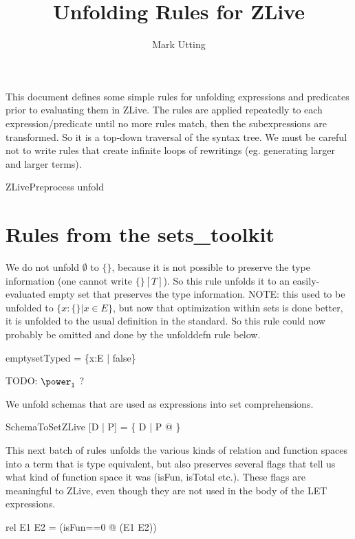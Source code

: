 \documentclass{article}
\title{Unfolding Rules for ZLive}
\author{Mark Utting}
\begin{document}
\maketitle


This document defines some simple rules for unfolding expressions 
and predicates prior to evaluating them in ZLive.  The rules are
applied repeatedly to each expression/predicate until no more rules
match, then the subexpressions are transformed.  So it is a top-down
traversal of the syntax tree.  We must be careful not to write rules
that create infinite loops of rewritings (eg. generating larger and
larger terms).

\begin{zsection}
  \SECTION ZLivePreprocess \parents unfold
\end{zsection}

\section{Rules from the sets\_toolkit}

We do not unfold $\emptyset$ to $\{\}$, because it is not possible
to preserve the type information (one cannot write $\{\}[T]$).
So this rule unfolds it to an easily-evaluated empty set that
preserves the type information.  
NOTE: this used to be unfolded to $\{x:\{\} | x \in E\}$, but
now that optimization within sets is done better, it is unfolded
to the usual definition in the standard.  So this rule could now
probably be omitted and done by the unfolddefn rule below.
\begin{zedrule}{emptysetTyped}
   \emptyset[E] = \{x:E | false\}  
\end{zedrule}

TODO: $\power_1$ ?

We unfold schemas that are used as expressions into set comprehensions.
\begin{zedrule}{SchemaToSetZLive}
[D | P] = \{ D | P @ \theta [D | true] \}
\end{zedrule}


This next batch of rules unfolds the various kinds of relation
and function spaces into a term that is type equivalent, but also
preserves several flags that tell us what kind of function space
it was (isFun, isTotal etc.).  These flags are meaningful to ZLive, 
even though they are not used in the body of the LET expressions.

\begin{zedrule}{rel}
   E1 \rel E2 = (\LET isFun==0 @ \power (E1 \cross E2))
\end{zedrule}
\end{document}
